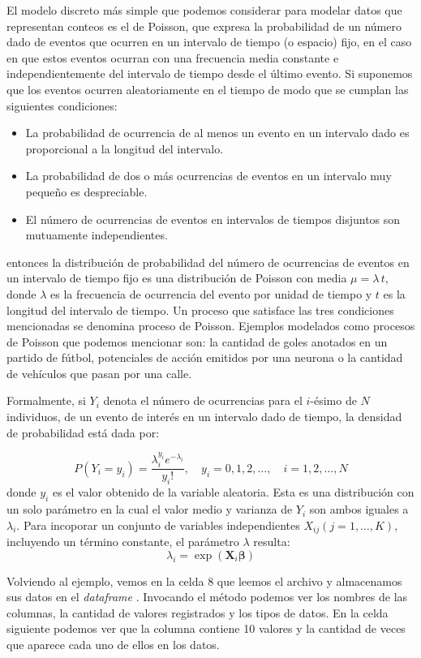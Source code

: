  El modelo discreto más simple que podemos considerar para modelar datos que representan conteos es el de Poisson, que expresa la probabilidad de un número dado de eventos que ocurren en un intervalo de tiempo (o espacio) fijo, en el caso en que estos eventos ocurran con una frecuencia media constante e independientemente del intervalo de tiempo desde el último evento. Si suponemos que los eventos ocurren aleatoriamente en el tiempo de modo que se cumplan las siguientes condiciones:
 \begin{itemize}
  \item La probabilidad de ocurrencia de al menos un evento en un intervalo dado es proporcional a la longitud del intervalo.
  \item La probabilidad de dos o más ocurrencias de eventos en un intervalo muy pequeño es despreciable.
  \item El número de ocurrencias de eventos en intervalos de tiempos disjuntos son mutuamente independientes.
 \end{itemize}
 entonces la distribución de probabilidad del número de ocurrencias de eventos en un intervalo de tiempo fijo es una distribución de Poisson con media $\mu = \lambda \, t$, donde $\lambda$ es la frecuencia de ocurrencia del evento por unidad de tiempo y $t$ es la longitud del intervalo de tiempo. Un proceso que satisface las tres condiciones mencionadas se denomina proceso de Poisson. Ejemplos modelados como procesos de Poisson que podemos mencionar son: la cantidad de goles anotados en un partido de fútbol, potenciales de acción emitidos por una neurona o la cantidad de vehículos que pasan por una calle.

 Formalmente, si $Y_i$ denota el número de ocurrencias para el $i$-ésimo de $N$ individuos, de un evento de interés en un intervalo dado de tiempo, la densidad de probabilidad está dada por:

 \[ P(Y_i = y_i) = \frac{\lambda_i^{y_i} e^{-\lambda_i}}{y_i!}, \quad y_i = 0, 1, 2, \ldots, \quad i = 1, 2, \ldots, N  \]
 donde $y_i$ es el valor obtenido de la variable aleatoria. Esta es una distribución con un solo parámetro en la cual el valor medio y varianza de $Y_i$ son ambos iguales a $\lambda_i$. Para incoporar un conjunto de variables independientes $X_{ij}(j = 1, \ldots, K)$, incluyendo un término constante, el parámetro $\lambda$ resulta:
 \[ \lambda_i = \exp(\bm{X}_i \bm{\beta}) \]

Volviendo al ejemplo, vemos en la celda 8 que leemos el archivo  y almacenamos sus datos en el \textit{dataframe} . Invocando el método  podemos ver los nombres de las columnas, la cantidad de valores registrados y los tipos de datos. En la celda siguiente podemos ver que la columna  contiene 10 valores y la cantidad de veces que aparece cada uno de ellos en los datos.


